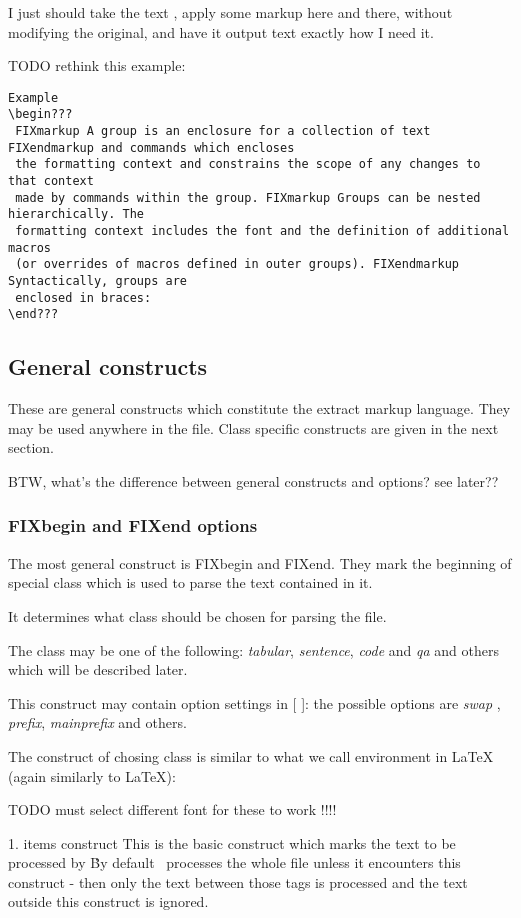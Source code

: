 \documentclass[a4paper,11pt]{article}
\newcommand{\probe}{\emph{\sc{probe{}}}}
\begin{document}
I just should take the text , apply some markup here and there, without
modifying the original, and have it output text exactly how I need it.

TODO rethink this example:

\begin{verbatim}
Example
\begin???
 FIXmarkup A group is an enclosure for a collection of text FIXendmarkup and commands which encloses
 the formatting context and constrains the scope of any changes to that context
 made by commands within the group. FIXmarkup Groups can be nested hierarchically. The
 formatting context includes the font and the definition of additional macros
 (or overrides of macros defined in outer groups). FIXendmarkup Syntactically, groups are
 enclosed in braces:
\end???

\end{verbatim}


\subsection{General constructs}
These are general constructs which constitute the extract markup language. They
may be used anywhere in the file.
Class specific constructs are given in the next section.

BTW, what's the difference between general constructs and options? see later??


\subsubsection{FIXbegin and FIXend options}
The most general construct is FIXbegin and FIXend. They mark the beginning of
special class which is used to parse the text contained in it.

It determines what class should be chosen for parsing the file.

The class may be one of the following:
\emph{tabular}, \emph{sentence}, \emph{code} and \emph{qa} and others which
will be described later.

This construct may contain option settings in [ ]:
the possible options are \emph{swap} , \emph{prefix}, \emph{mainprefix} and
others.


The construct of chosing class is similar to what we call environment in LaTeX
(again similarly to LaTeX):

TODO must select different font for these to work !!!!

1.  items construct This is the basic construct which marks the text to
be processed by \probe\. By default \probe\ processes the whole file unless it
encounters this construct - then only the text between those tags is processed
and the text outside this construct is ignored.
\end{document}
